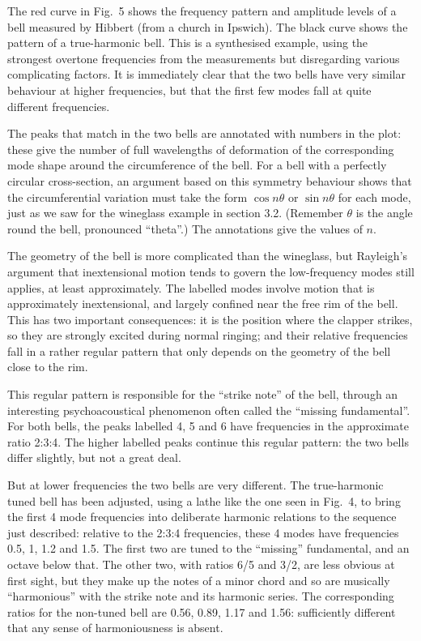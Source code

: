   The red curve in Fig.\ 5 shows the frequency pattern and amplitude levels of 
  a bell measured by Hibbert (from a church in Ipswich). The black curve shows 
  the pattern of a true-harmonic bell. This is a synthesised example, using the 
  strongest overtone frequencies from the measurements but disregarding various 
  complicating factors. It is immediately clear that the two bells have very 
  similar behaviour at higher frequencies, but that the first few modes fall at 
  quite different frequencies. 

  The peaks that match in the two bells are annotated with numbers in the plot: 
  these give the number of full wavelengths of deformation of the corresponding 
  mode shape around the circumference of the bell. For a bell with a perfectly 
  circular cross-section, an argument based on this symmetry behaviour shows 
  that the circumferential variation must take the form $\cos n \theta$ or 
  $\sin n \theta$ for each mode, just as we saw for the wineglass example in 
  section 3.2. (Remember $\theta$ is the angle round the bell, pronounced 
  ``theta''.) The annotations give the values of $n$. 

  The geometry of the bell is more complicated than the wineglass, but 
  Rayleigh's argument that inextensional motion tends to govern the 
  low-frequency modes still applies, at least approximately. The labelled modes 
  involve motion that is approximately inextensional, and largely confined near 
  the free rim of the bell. This has two important consequences: it is the 
  position where the clapper strikes, so they are strongly excited during 
  normal ringing; and their relative frequencies fall in a rather regular 
  pattern that only depends on the geometry of the bell close to the rim. 

  This regular pattern is responsible for the ``strike note'' of the bell, 
  through an interesting psychoacoustical phenomenon often called the ``missing 
  fundamental''. For both bells, the peaks labelled 4, 5 and 6 have frequencies 
  in the approximate ratio 2:3:4. The higher labelled peaks continue this 
  regular pattern: the two bells differ slightly, but not a great deal. 

  But at lower frequencies the two bells are very different. The true-harmonic 
  tuned bell has been adjusted, using a lathe like the one seen in Fig.\ 4, to 
  bring the first 4 mode frequencies into deliberate harmonic relations to the 
  sequence just described: relative to the 2:3:4 frequencies, these 4 modes 
  have frequencies 0.5, 1, 1.2 and 1.5. The first two are tuned to the 
  ``missing'' fundamental, and an octave below that. The other two, with ratios 
  6/5 and 3/2, are less obvious at first sight, but they make up the notes of a 
  minor chord and so are musically ``harmonious'' with the strike note and its 
  harmonic series. The corresponding ratios for the non-tuned bell are 0.56, 
  0.89, 1.17 and 1.56: sufficiently different that any sense of harmoniousness 
  is absent. 

